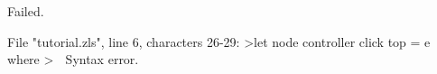 \runverbatimfalse
{}
\begin{RunVerbatimMsg}
Failed.
\end{RunVerbatimMsg}
\begin{RunVerbatimErr}
File "tutorial.zls", line 6, characters 26-29:
>let node controller click top = e where
>                          ^^^
Syntax error.
\end{RunVerbatimErr}
